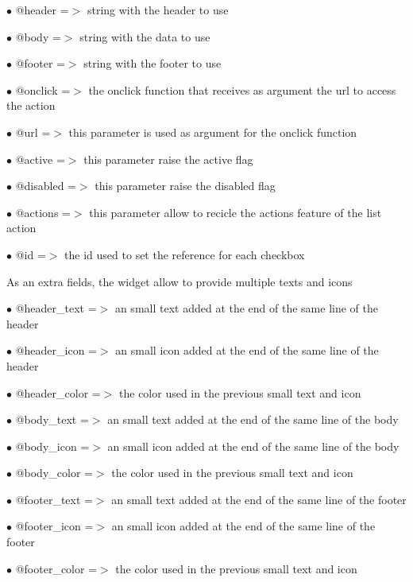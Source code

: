 \documentclass[a4paper]{article}
\begin{document}
\begin{compactitem}
\item[\color{myblue}$\bullet$] @header   =$>$ string with the header to use
\item[\color{myblue}$\bullet$] @body     =$>$ string with the data to use
\item[\color{myblue}$\bullet$] @footer   =$>$ string with the footer to use
\item[\color{myblue}$\bullet$] @onclick  =$>$ the onclick function that receives as argument the url to access the action
\item[\color{myblue}$\bullet$] @url      =$>$ this parameter is used as argument for the onclick function
\item[\color{myblue}$\bullet$] @active   =$>$ this parameter raise the active flag
\item[\color{myblue}$\bullet$] @disabled =$>$ this parameter raise the disabled flag
\item[\color{myblue}$\bullet$] @actions  =$>$ this parameter allow to recicle the actions feature of the list action
\item[\color{myblue}$\bullet$] @id       =$>$ the id used to set the reference for each checkbox
\end{compactitem}

As an extra fields, the widget allow to provide multiple texts and icons

\begin{compactitem}
\item[\color{myblue}$\bullet$] @header\_text  =$>$ an small text added at the end of the same line of the header
\item[\color{myblue}$\bullet$] @header\_icon  =$>$ an small icon added at the end of the same line of the header
\item[\color{myblue}$\bullet$] @header\_color =$>$ the color used in the previous small text and icon
\item[\color{myblue}$\bullet$] @body\_text    =$>$ an small text added at the end of the same line of the body
\item[\color{myblue}$\bullet$] @body\_icon    =$>$ an small icon added at the end of the same line of the body
\item[\color{myblue}$\bullet$] @body\_color   =$>$ the color used in the previous small text and icon
\item[\color{myblue}$\bullet$] @footer\_text  =$>$ an small text added at the end of the same line of the footer
\item[\color{myblue}$\bullet$] @footer\_icon  =$>$ an small icon added at the end of the same line of the footer
\item[\color{myblue}$\bullet$] @footer\_color =$>$ the color used in the previous small text and icon
\end{compactitem}
\end{document}
